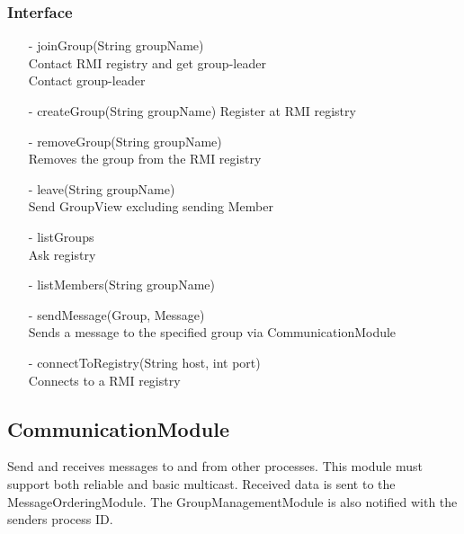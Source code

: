 \documentclass[english]{article}
\begin{document}
\subsubsection{Interface}
\begin{itemize}
\item[-]  joinGroup(String groupName) \\
	Contact RMI registry and get group-leader \\
	Contact group-leader

\item[-]  createGroup(String groupName)
	Register at RMI registry

\item[-]  removeGroup(String groupName) \\
	Removes the group from the RMI registry

\item[-] leave(String groupName) \\
	Send GroupView excluding sending Member

\item[-]  listGroups \\
	Ask registry

\item[-]  listMembers(String groupName)

\item[-]  sendMessage(Group, Message) \\
	Sends a message to the specified group via CommunicationModule

\item[-]  connectToRegistry(String host, int port) \\
	Connects to a RMI registry
\end{itemize}


\subsection{CommunicationModule}
Send and receives messages to and from other processes. This module must support both reliable and basic multicast. Received data is sent to the MessageOrderingModule. The GroupManagementModule is also notified with the senders process ID. 
\end{document}
